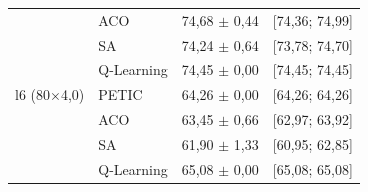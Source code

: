 \begin{table}[htb]
\begin{tabular}{llcc}
         & ACO & 74,68 $\pm$ 0,44 & [74,36; 74,99] \\
         & SA & 74,24 $\pm$ 0,64 & [73,78; 74,70] \\
         & Q-Learning & 74,45 $\pm$ 0,00 & [74,45; 74,45] \\
        \hline
        l6 (80$\times$4,0) & PETIC & 64,26 $\pm$ 0,00 & [64,26; 64,26] \\
         & ACO & 63,45 $\pm$ 0,66 & [62,97; 63,92] \\
         & SA & 61,90 $\pm$ 1,33 & [60,95; 62,85] \\
         & Q-Learning & 65,08 $\pm$ 0,00 & [65,08; 65,08] \\
        \hline
    \end{tabular}
\end{table}
